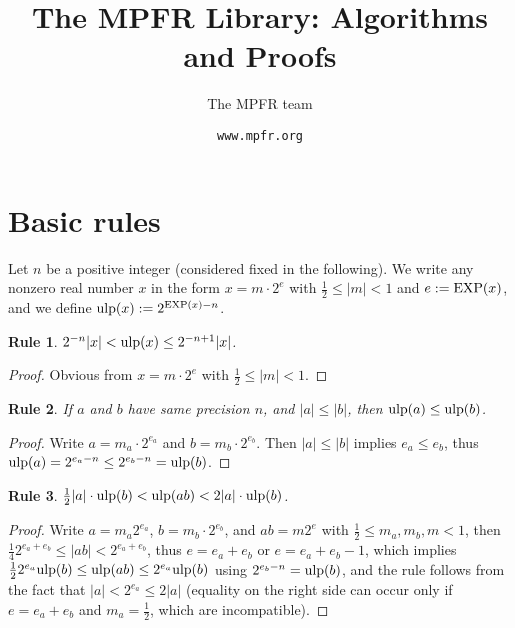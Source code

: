 \documentclass[12pt]{amsart}
\title{The MPFR Library: Algorithms and Proofs}
\author{The MPFR team}
\date{\tt www.mpfr.org}
\def\ulp{{\rm ulp}}
\newtheorem{Rule}{Rule}
\begin{document}
\maketitle

\tableofcontents

\section{Basic rules}

Let $n$ be a positive integer (considered fixed in the following).
We write any nonzero real number $x$ in the form $x = m \cdot 2^e$
with $\frac{1}{2} \le |m| < 1$ and $e := {\rm EXP}(x)$, and
we define $\ulp(x) := 2^{{\rm EXP}(x) - n}$.

\begin{Rule} \label{R1}
$2^{-n} |x| < \ulp(x) \le 2^{-n+1} |x|$.
\end{Rule}
\begin{proof}
Obvious from $x = m \cdot 2^e$ with $\frac{1}{2} \le |m| < 1$.
\end{proof}

\begin{Rule} \label{R2}
If $a$ and $b$ have same precision $n$,
and $|a| \le |b|$, then $\ulp(a) \le \ulp(b)$.
\end{Rule}
\begin{proof}
Write $a = m_a \cdot 2^{e_a}$ and $b = m_b \cdot 2^{e_b}$.
Then $|a| \le |b|$ implies $e_a \le e_b$, thus
$\ulp(a) = 2^{e_a-n} \le 2^{e_b-n} = \ulp(b)$.
\end{proof}


\begin{Rule} \label{R4}
$\frac{1}{2} |a| \cdot \ulp(b) < \ulp(a b) < 2 |a| \cdot \ulp(b)$.
\end{Rule}
\begin{proof}
Write $a = m_a 2^{e_a}$, $b = m_b \cdot 2^{e_b}$, and $a b = m 2^e$
with $\frac{1}{2} \le m_a, m_b, m < 1$,
then $\frac{1}{4} 2^{e_a+e_b} \le |a b| < 2^{e_a+e_b}$,
thus $e = e_a + e_b$ or $e = e_a + e_b - 1$, which implies
$\frac{1}{2} 2^{e_a} \ulp(b) \le \ulp(a b) \le 2^{e_a} \ulp(b)$
using $2^{e_b-n} = \ulp(b)$, and the rule follows from
the fact that $|a| < 2^{e_a} \le 2|a|$ (equality on the right side can
occur only if $e = e_a + e_b$ and $m_a = \frac{1}{2}$, which are
incompatible).
\end{proof}
\end{document}
